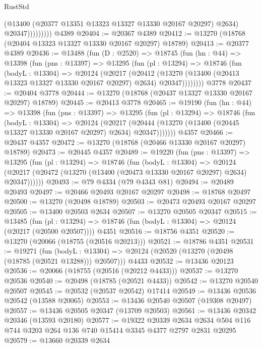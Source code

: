 \begin{lexlean}{RustStd}
\begin{coremodule}
                      (@13400 (@20377 @13351 @13323 @13327 @13330 @20167 @20297) @2634)
                      @20347)))))))))
    @4389
@20404 := @20367 @4389
@20412 := @13270 (@18768 (@20404 @13323 @13327 @13330 @20167 @20297) @18789)
@20413 := @20377 @4389
@20436 := @13488
    (fun (D : @2520) =>
    @18745
      (fun (hn : @44) =>
      @13398
        (fun (pns : @13397) =>
        @13295
          (fun (pl : @13294) =>
          @18746
            (fun (bodyL : @13304) =>
            @20124
              (@20217
                (@20412
                  (@13270 (@13400 (@20413 @13323 @13327 @13330 @20167 @20297) @2634) @20347))))))))
    @3778
@20437 := @20404 @3778
@20444 := @13270 (@18768 (@20437 @13327 @13330 @20167 @20297) @18789)
@20445 := @20413 @3778
@20465 := @19190
    (fun (hn : @44) =>
    @13398
      (fun (pns : @13397) =>
      @13295
        (fun (pl : @13294) =>
        @18746
          (fun (bodyL : @13304) =>
          @20124
            (@20217
              (@20444 (@13270 (@13400 (@20445 @13327 @13330 @20167 @20297) @2634) @20347)))))))
    @4357
@20466 := @20437 @4357
@20472 := @13270 (@18768 (@20466 @13330 @20167 @20297) @18789)
@20473 := @20445 @4357
@20489 := @19220
    (fun (pns : @13397) =>
    @13295
      (fun (pl : @13294) =>
      @18746
        (fun (bodyL : @13304) =>
        @20124 (@20217 (@20472 (@13270 (@13400 (@20473 @13330 @20167 @20297) @2634) @20347))))))
@20493 := @79 @4334 (@79 @4343 @81)
@20494 := @20489 @20493
@20497 := @20466 @20493 @20167 @20297
@20498 := @18768 @20497
@20500 := @13270 (@20498 @18789)
@20503 := @20473 @20493 @20167 @20297
@20505 := @13400 @20503 @2634
@20507 := @13270 @20505 @20347
@20515 := @13485
    (fun (pl : @13294) => @18746 (fun (bodyL : @13304) => @20124 (@20217 (@20500 @20507))))
    @4351
@20516 := @18756 @4351
@20520 := @13270 (@20066 (@18755 (@20516 @20213)))
@20521 := @18786 @4351
@20531 := @19271
    (fun (bodyL : @13304) => @20124 (@20520 (@13270 (@20498 (@18785 (@20521 @13288))) @20507)))
    @4433
@20532 := @13436 @20123
@20536 := @20066 (@18755 (@20516 (@20212 @4433)))
@20537 := @13270 @20536
@20540 := @20498 (@18785 (@20521 @4433))
@20542 := @13270 @20540 @20507
@20545 := @20532 (@20537 @20542) @17414
@20549 := @13436 @20536 @20542 (@13588 @20065)
@20553 := @13436 @20540 @20507 (@19308 @20497)
@20557 := @13436 @20505 @20347 (@13709 @20503)
@20561 := @13436 @20342 @20346 (@13593 @20180)
@20577 := @19322
    @20339
    @2634
    @2634
    @504
    @116
    @744
    @3203
    @264
    @136
    @740
    @15414
    @3345
    @4377
    @2797
    @2831
    @20295
@20579 := @13660 @20339 @2634

\end{coremodule}
\end{lexlean}
